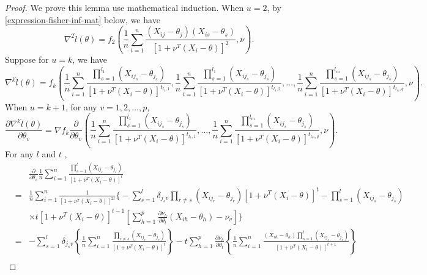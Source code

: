 \begin{proof}
We prove this lemma use mathematical induction. When $u=2$, by \eqref{expression-fisher-inf-mat}
below, we have 
\[
\nabla^{2}\hat{l}\left(\theta\right)=f_{2}\left(\frac{1}{n}\sum_{i=1}^{n}\frac{\left(X_{ij}-\theta_{j}\right)\left(X_{is}-\theta_{s}\right)}{\left[1+\nu^{T}\left(X_{i}-\theta\right)\right]^{2}},\nu\right).
\]
Suppose for $u=k$, we have 
\[
\nabla^{k}\hat{l}\left(\theta\right)=f_{k}\left(\frac{1}{n}\sum_{i=1}^{n}\frac{\prod_{s=1}^{l_{1}}\left(X_{ij_{s}}-\theta_{j_{s}}\right)}{\left[1+\nu^{T}\left(X_{i}-\theta\right)\right]^{t_{l_{1},1}}},\frac{1}{n}\sum_{i=1}^{n}\frac{\prod_{s=1}^{l_{1}}\left(X_{ij_{s}}-\theta_{j_{s}}\right)}{\left[1+\nu^{T}\left(X_{i}-\theta\right)\right]^{t_{l_{1},2}}},\ldots,\frac{1}{n}\sum_{i=1}^{n}\frac{\prod_{s=1}^{l_{m}}\left(X_{ij_{s}}-\theta_{j_{s}}\right)}{\left[1+\nu^{T}\left(X_{i}-\theta\right)\right]^{t_{l_{m},q}}},\nu\right).
\]
When $u=k+1$, for any $v=1,2,\ldots,p$, 
\[
\frac{\partial\nabla^{k}\hat{l}\left(\theta\right)}{\partial\theta_{v}}=\nabla f_{k}\frac{\partial}{\partial\theta_{v}}\left(\frac{1}{n}\sum_{i=1}^{n}\frac{\prod_{s=1}^{l_{1}}\left(X_{ij_{s}}-\theta_{j_{s}}\right)}{\left[1+\nu^{T}\left(X_{i}-\theta\right)\right]^{t_{l_{1},1}}},\ldots,\frac{1}{n}\sum_{i=1}^{n}\frac{\prod_{s=1}^{l_{m}}\left(X_{ij_{s}}-\theta_{j_{s}}\right)}{\left[1+\nu^{T}\left(X_{i}-\theta\right)\right]^{t_{l_{m},q}}},\nu\right).
\]
For any $l$ and $t$ , 
\begin{eqnarray*}
 &  & \frac{\partial}{\partial\theta_{v}}\frac{1}{n}\sum_{i=1}^{n}\frac{\prod_{s=1}^{l}\left(X_{ij_{s}}-\theta_{j_{s}}\right)}{\left[1+\nu^{T}\left(X_{i}-\theta\right)\right]^{t}}\\
 & = & \frac{1}{n}\sum_{i=1}^{n}\frac{1}{\left[1+\nu^{T}\left(X_{i}-\theta\right)\right]^{2t}}\Bigg\{-\sum_{s=1}^{l}\delta_{j_{s}v}\prod_{r\neq s}\left(X_{ij_{r}}-\theta_{j_{r}}\right)\left[1+\nu^{T}\left(X_{i}-\theta\right)\right]^{t}-\prod_{s=1}^{l}\left(X_{ij_{s}}-\theta_{j_{s}}\right)\\
 &  & \times t\left[1+\nu^{T}\left(X_{i}-\theta\right)\right]^{t-1}\left[\sum_{h=1}^{p}\frac{\partial\nu_{h}}{\partial\theta_{t}}\left(X_{ih}-\theta_{h}\right)-\nu_{v}\right]\Bigg\}\\
 & = & -\sum_{s=1}^{l}\delta_{j_{s}v}\left\{ \frac{1}{n}\sum_{i=1}^{n}\frac{\prod_{r\neq s}\left(X_{ij_{r}}-\theta_{j_{r}}\right)}{\left[1+\nu^{T}\left(X_{i}-\theta\right)\right]^{t}}\right\} -t\sum_{h=1}^{p}\frac{\partial\nu_{h}}{\partial\theta_{t}}\left\{ \frac{1}{n}\sum_{i=1}^{n}\frac{\left(X_{ih}-\theta_{h}\right)\prod_{s=1}^{l}\left(X_{ij_{s}}-\theta_{j_{s}}\right)}{\left[1+\nu^{T}\left(X_{i}-\theta\right)\right]^{t+1}}\right\} \\

\end{eqnarray*}
\end{proof}

